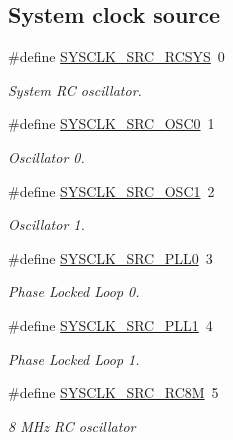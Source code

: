 \subsection*{\-System clock source}
\begin{DoxyCompactItemize}
\item 
\#define \hyperlink{group__sysclk__group_ga95a749ec308ac07efb9521f2f56ad351}{\-S\-Y\-S\-C\-L\-K\-\_\-\-S\-R\-C\-\_\-\-R\-C\-S\-Y\-S}~0
\begin{DoxyCompactList}\small\item\em \-System \-R\-C oscillator. \end{DoxyCompactList}\item 
\#define \hyperlink{group__sysclk__group_ga40595c85aa33898ff3a6cfbd4f8ef7b9}{\-S\-Y\-S\-C\-L\-K\-\_\-\-S\-R\-C\-\_\-\-O\-S\-C0}~1
\begin{DoxyCompactList}\small\item\em \-Oscillator 0. \end{DoxyCompactList}\item 
\#define \hyperlink{group__sysclk__group_ga9d44be291573208b5b1152f2b6ab1d3a}{\-S\-Y\-S\-C\-L\-K\-\_\-\-S\-R\-C\-\_\-\-O\-S\-C1}~2
\begin{DoxyCompactList}\small\item\em \-Oscillator 1. \end{DoxyCompactList}\item 
\#define \hyperlink{group__sysclk__group_gacce44c311c87522d71fe51bf4cd37f58}{\-S\-Y\-S\-C\-L\-K\-\_\-\-S\-R\-C\-\_\-\-P\-L\-L0}~3
\begin{DoxyCompactList}\small\item\em \-Phase \-Locked \-Loop 0. \end{DoxyCompactList}\item 
\#define \hyperlink{group__sysclk__group_gaa46c965047bb81e94066d8df57cb719f}{\-S\-Y\-S\-C\-L\-K\-\_\-\-S\-R\-C\-\_\-\-P\-L\-L1}~4
\begin{DoxyCompactList}\small\item\em \-Phase \-Locked \-Loop 1. \end{DoxyCompactList}\item 
\#define \hyperlink{group__sysclk__group_gaa3b782df811d75bf3cf9f4ba8c2266b0}{\-S\-Y\-S\-C\-L\-K\-\_\-\-S\-R\-C\-\_\-\-R\-C8\-M}~5
\begin{DoxyCompactList}\small\item\em 8 \-M\-Hz \-R\-C oscillator \end{DoxyCompactList}\end{DoxyCompactItemize}
